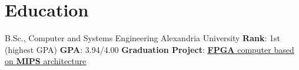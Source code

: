 \documentclass[letterpaper]{twentysecondcv} %
\newcommand{\myhy}[2]{\underline{\href{#1}{#2}}}
\begin{document}
\section{Education}

\begin{twenty} %
               {B.Sc., Computer and Systems Engineering}
               {Alexandria University}
               {\textbf{Rank}: 1st (highest GPA)\newline
                \textbf{GPA}: 3.94/4.00\newline
                \textbf{Graduation Project}: \myhy{https://github.com/iocoder/graduation}
                                             {\textbf{FPGA} computer based on \textbf{MIPS} architecture}
               }
\end{twenty}



\end{document}
